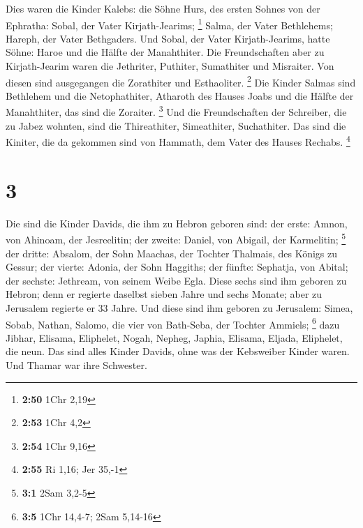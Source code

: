 Dies waren die Kinder Kalebs: die Söhne Hurs, des ersten
Sohnes von der Ephratha: Sobal, der Vater Kirjath-Jearims; \footnote{\textbf{2:50}
  1Chr 2,19}  Salma, der Vater Bethlehems; Hareph, der
Vater Bethgaders.  Und Sobal, der Vater Kirjath-Jearims,
hatte Söhne: Haroe und die Hälfte der Manahthiter.  Die
Freundschaften aber zu Kirjath-Jearim waren die Jethriter, Puthiter,
Sumathiter und Misraiter. Von diesen sind ausgegangen die Zorathiter und
Esthaoliter. \footnote{\textbf{2:53} 1Chr 4,2}  Die Kinder
Salmas sind Bethlehem und die Netophathiter, Atharoth des Hauses Joabs
und die Hälfte der Manahthiter, das sind die Zoraiter. \footnote{\textbf{2:54}
  1Chr 9,16}  Und die Freundschaften der Schreiber, die zu
Jabez wohnten, sind die Thireathiter, Simeathiter, Suchathiter. Das sind
die Kiniter, die da gekommen sind von Hammath, dem Vater des Hauses
Rechabs. \footnote{\textbf{2:55} Ri 1,16; Jer 35,-1}

\hypertarget{section-1}{%
\section{3}\label{section-1}}

 Die sind die Kinder Davids, die ihm zu Hebron geboren sind:
der erste: Amnon, von Ahinoam, der Jesreelitin; der zweite: Daniel, von
Abigail, der Karmelitin; \footnote{\textbf{3:1} 2Sam 3,2-5} 
der dritte: Absalom, der Sohn Maachas, der Tochter Thalmais, des Königs
zu Gessur; der vierte: Adonia, der Sohn Haggiths;  der
fünfte: Sephatja, von Abital; der sechste: Jethream, von seinem Weibe
Egla.  Diese sechs sind ihm geboren zu Hebron; denn er
regierte daselbst sieben Jahre und sechs Monate; aber zu Jerusalem
regierte er 33 Jahre.  Und diese sind ihm geboren zu
Jerusalem: Simea, Sobab, Nathan, Salomo, die vier von Bath-Seba, der
Tochter Ammiels; \footnote{\textbf{3:5} 1Chr 14,4-7; 2Sam 5,14-16}
 dazu Jibhar, Elisama, Eliphelet,  Nogah,
Nepheg, Japhia,  Elisama, Eljada, Eliphelet, die neun.
 Das sind alles Kinder Davids, ohne was der Kebsweiber
Kinder waren. Und Thamar war ihre Schwester.

